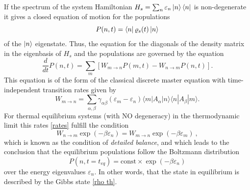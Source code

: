 If the spectrum of the system Hamiltonian $H_s=\sum_n \varepsilon_n\ket{n}\bra{n}$ is non-degenerate it gives a closed equation of motion for the populations
\begin{equation}
    P(n,t)=\bra{n}\varrho_s(t)\ket{n}
\end{equation} 
of the $\ket{n}$ eigenstate. Thus, the equation for the diagonals of the density matrix in the eigenbasis of \( H_s \) and the populations are governed by the equation
\begin{equation}\label{Pauli Equation}
\frac{d}{dt}P(n,t) = \sum_m \left[ W_{m\to n} P(m,t) - W_{n\to m} P(n,t) \right]. 
\end{equation}
This equation is of the form of the classical discrete master equation with time-independent transition rates given by
\begin{equation}\label{rates}
W_{m\to n} = \sum_{\alpha,\beta} \gamma_{\alpha \beta}(\varepsilon_m - \varepsilon_n) \langle m | A_\alpha | n \rangle \langle n | A_\beta | m \rangle.
\end{equation}
For thermal equilibrium systems (with NO degeneracy) in the thermodynamic limit this rates \eqref{rates} fulfill the condition \cite{breuer2002open}
\begin{equation}\label{Detailed Balance}
W_{n\to m} \exp(-\beta \varepsilon_n) = W_{m\to n} \exp(-\beta \varepsilon_m) \  ,
\end{equation}
which is known as the condition of \textit{detailed balance}, and which leads to the conclusion that the equilibrium populations follow the Boltzmann distribution
\begin{equation}
P(n,t = t_{eq}) = \text{const} \times \exp(-\beta \varepsilon_n) 
\end{equation}
over the energy eigenvalues \( \varepsilon_n \). In other words, that the state in equilibrium is described by the Gibbs state \eqref{rho th}.
